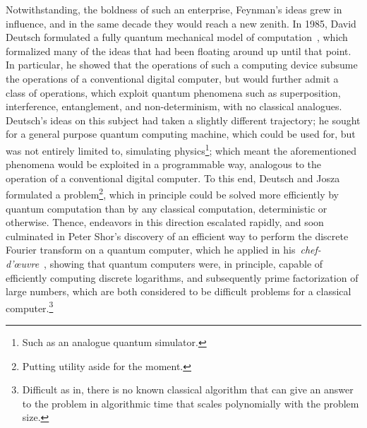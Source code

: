 \noindent
Notwithstanding, the boldness of such an enterprise, Feynman's ideas grew in influence, and in the same decade they would reach a new zenith. In 1985, David Deutsch formulated a fully quantum mechanical model of computation~\cite{Deutsch_1985,Deutsch_1989}, which formalized many of the ideas that had been floating around up until that point. In particular, he showed that the operations of such a computing device subsume the operations of a conventional digital computer, but would further admit a class of operations, which exploit quantum phenomena such as superposition, interference, entanglement, and non-determinism, with no classical analogues. Deutsch's ideas on this subject had taken a slightly different trajectory; he sought for a general purpose quantum computing machine, which could be used for, but was not entirely limited to, simulating physics\footnote{Such as an analogue quantum simulator.}; which meant the aforementioned phenomena would be exploited in a programmable way, analogous to the operation of a conventional digital computer. To this end, Deutsch and Josza~\cite{DeutschJozsa_1992} formulated a problem\footnote{Putting utility aside for the moment.}, which in principle could be solved more efficiently by quantum computation than by any classical computation, deterministic or otherwise. Thence, endeavors in this direction escalated rapidly, and soon culminated in Peter Shor's discovery of an efficient way to perform the discrete Fourier transform on a quantum computer, which he applied in his~\emph{chef-d'œuvre}~\cite{Shor_1997}, showing that quantum computers were, in principle, capable of efficiently computing discrete logarithms, and subsequently prime factorization of large numbers, which are both considered to be difficult problems for a classical computer.\footnote{Difficult as in, there is no known classical algorithm that can give an answer to the problem in algorithmic time that scales polynomially with the problem size.}

